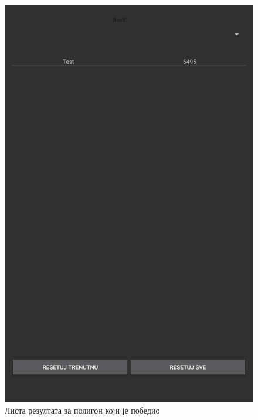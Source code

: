 \begin{figure}[htb!]
\begin{center}
\includegraphics[scale=.1]{pictures/game/gameHighScore}
\caption{Листа резултата за полигон који је победио}\label{fig:gameGameHighScore}
\end{center}
\end{figure}


